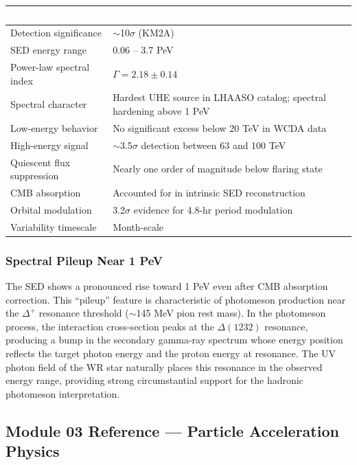 \documentclass[11pt,letterpaper]{article}
\newcommand{\tableheader}[1]{\textbf{\sffamily\textcolor{white}{#1}}}
\begin{document}
\begin{center}
\begin{tabularx}{\textwidth}{L{5cm}X}
\toprule
{}
\tableheader{Observable} & \tableheader{Measured Value} \\
\midrule
Detection significance & $\sim$10$\sigma$ (KM2A) \\
SED energy range & 0.06 -- 3.7 PeV \\
Power-law spectral index & $\Gamma = 2.18 \pm 0.14$ \\
Spectral character & Hardest UHE source in LHAASO catalog; spectral hardening above 1 PeV \\
Low-energy behavior & No significant excess below 20 TeV in WCDA data \\
High-energy signal & $\sim$3.5$\sigma$ detection between 63 and 100 TeV \\
Quiescent flux suppression & Nearly one order of magnitude below flaring state \\
CMB absorption & Accounted for in intrinsic SED reconstruction \\
Orbital modulation & 3.2$\sigma$ evidence for 4.8-hr period modulation \\
Variability timescale & Month-scale \\
\bottomrule
\end{tabularx}
\end{center}

\subsubsection{Spectral Pileup Near 1 PeV}

The SED shows a pronounced rise toward 1 PeV even after CMB absorption correction. This ``pileup'' feature is characteristic of photomeson production near the $\Delta^+$ resonance threshold ($\sim$145 MeV pion rest mass). In the photomeson process, the interaction cross-section peaks at the $\Delta(1232)$ resonance, producing a bump in the secondary gamma-ray spectrum whose energy position reflects the target photon energy and the proton energy at resonance. The UV photon field of the WR star naturally places this resonance in the observed energy range, providing strong circumstantial support for the hadronic photomeson interpretation.

\subsection{Module 03 Reference --- Particle Acceleration Physics}
\end{document}
